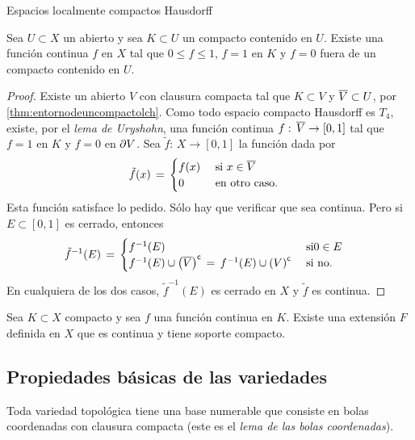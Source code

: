\begin{subsubsection}{Espacios localmente compactos Hausdorff}
\begin{propoUrysohnLCH}\label{thm:urysohnlch}
	Sea $U\subset X$ un abierto y sea $K\subset U$ un compacto contenido
	en $U$. Existe una funci\'{o}n continua $f$ en $X$ tal que
	$0\leq f\leq 1$, $f=1$ en $K$ y $f=0$ fuera de un compacto contenido
	en $U$.
\end{propoUrysohnLCH}

\begin{proof}
	Existe un abierto $V$ con clausura compacta tal que $K\subset V$
	y $\clos{V}\subset U$, por \ref{thm:entornodeuncompactolch}.
	Como todo espacio compacto Hausdorff es $T_{4}$, existe, por
	el \emph{lema de Uryshohn}, una funci\'{o}n continua
	$f:\,\clos{V}\rightarrow[0,1]$ tal que $f=1$ en $K$ y $f=0$ en
	$\borde[V]$. Sea $\tilde{f}:\,X\rightarrow[0,1]$ la funci\'{o}n
	dada por
	\begin{align*}
		\tilde{f}(x) & \,=\,
			\begin{cases}
				f(x) & \text{ si }x\in\clos{V} \\
				0 & \text{ en otro caso.}
			\end{cases}
	\end{align*}
	Esta funci\'{o}n satisface lo pedido. S\'{o}lo hay que verificar que
	sea continua. Pero si $E\subset [0,1]$ es cerrado, entonces
	\begin{align*}
		\tilde{f}^{-1}(E) & \,=\,
			\begin{cases}
				f^{-1}(E) & \text{ si}0\in E \\
				f^{-1}(E)\cup\setcomp{\clos{V}}
				\,=\,f^{-1}(E)\cup\setcomp{V} & \text{ si no.}
			\end{cases}
	\end{align*}
	En cualquiera de los dos casos, $\tilde{f}^{-1}(E)$ es cerrado en
	$X$ y $\tilde{f}$ es continua.
\end{proof}

\begin{propoTietzeLCH}\label{thm:tietzelch}
	Sea $K\subset X$ compacto y sea $f$ una funci\'{o}n continua en $K$.
	Existe una extensi\'{o}n $F$ definida en $X$ que es continua y
	tiene soporte compacto.
\end{propoTietzeLCH}

\end{subsubsection}

\subsection{Propiedades b\'{a}sicas de las variedades}
Toda variedad topol\'{o}gica tiene una base numerable que consiste en bolas
coordenadas con clausura compacta (este es el \emph{lema de las bolas
coordenadas}).

